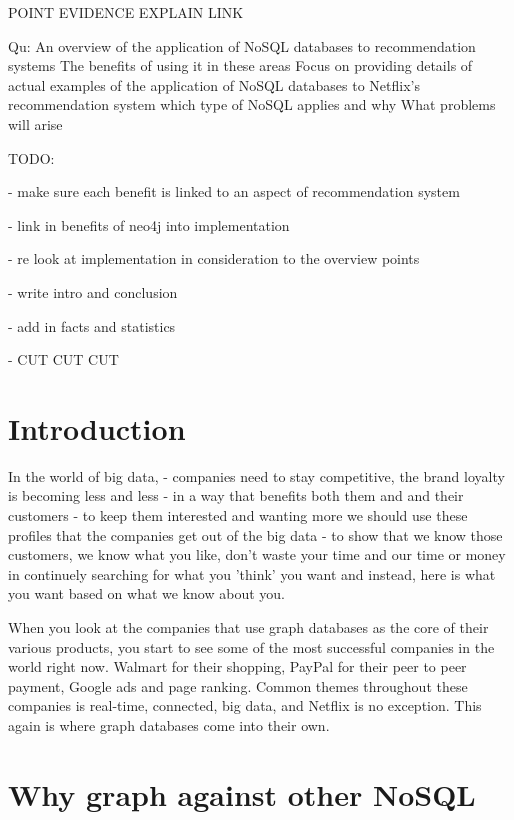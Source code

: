 \documentclass[a4paper]{article}
\begin{document}
\justify

POINT
EVIDENCE
EXPLAIN
LINK

Qu:
An overview of the application of NoSQL databases to recommendation systems
    The benefits of using it in these areas
Focus on providing details of actual examples of the application of NoSQL databases to Netflix's recommendation system
    which type of NoSQL applies and why
    What problems will arise
\par
TODO: \par
- make sure each benefit is linked to an aspect of recommendation system \par
- link in benefits of neo4j into implementation \par
    - re look at implementation in consideration to the overview points \par
- write intro and conclusion \par
- add in facts and statistics \par
- CUT CUT CUT \par


\section{Introduction}
\label{sec:Introduction}
In the world of big data,
- companies need to stay competitive, the brand loyalty is becoming less and less
- in a way that benefits both them and and their customers
- to keep them interested and wanting more we should use these profiles that the companies get out of the big data
- to show that we know those customers, we know what you like, don't waste your time and our time or money in continuely searching for what you 'think' you want and instead, here is what you want based on what we know about you.

When you look at the companies that use graph databases as the core of their various products, you start to see some of the most successful companies in the world right now. Walmart for their shopping, PayPal for their peer to peer payment, Google ads and page ranking. Common themes throughout these companies is real-time, connected, big data, and Netflix is no exception. This again is where graph databases come into their own.

\section{Why graph against other NoSQL}
\label{sec:Why graph against other NoSQL}
\end{document}
